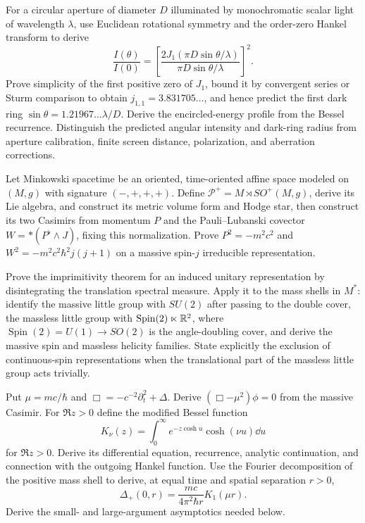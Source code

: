 \begin{exercise}
For a circular aperture of diameter $D$ illuminated by monochromatic scalar
light of wavelength $\lambda$, use Euclidean rotational symmetry and the
order-zero Hankel transform to derive
\[
 \frac{I(\theta)}{I(0)}=
 \left[\frac{2J_1(\pi D\sin\theta/\lambda)}
 {\pi D\sin\theta/\lambda}\right]^2.
\]
Prove simplicity of the first positive zero of $J_1$, bound it by convergent
series or Sturm comparison to obtain $j_{1,1}=3.831705\ldots$, and hence
predict the first dark ring
$\sin\theta=1.21967\ldots\lambda/D$.  Derive the encircled-energy profile
from the Bessel recurrence.  Distinguish the predicted angular intensity and
dark-ring radius from aperture calibration, finite screen distance,
polarization, and aberration corrections.
\end{exercise}

\begin{exercise}
Let Minkowski spacetime be an oriented, time-oriented affine space modeled on
$(M,g)$ with signature $(-,+,+,+)$.  Define
$\mathcal P^+=M\rtimes SO^+(M,g)$, derive its Lie algebra, and construct its
metric volume form and Hodge star, then construct its two Casimirs from
momentum $P$ and the Pauli--Lubanski covector
$W=* (P^\flat\wedge J)$, fixing this normalization.  Prove
$P^2=-m^2c^2$ and $W^2=-m^2c^2\hbar^2j(j+1)$ on a massive spin-$j$
irreducible representation.
\end{exercise}

\begin{exercise}
Prove the imprimitivity theorem for an induced unitary representation by
disintegrating the translation spectral measure.  Apply it to the mass shells
in $M^*$: identify the massive little group with $SU(2)$ after
passing to the double cover, the massless little group with
$\operatorname{Spin}(2)\ltimes\mathbb R^2$, where
$\operatorname{Spin}(2)=U(1)\to SO(2)$ is the angle-doubling cover, and
derive the massive spin and massless
helicity families.  State explicitly the exclusion of continuous-spin
representations when the translational part of the massless little group acts
trivially.
\end{exercise}

\begin{exercise}
Put $\mu=mc/\hbar$ and
$\Box=-c^{-2}\partial_t^2+\Delta$.  Derive
$(\Box-\mu^2)\phi=0$ from the massive Casimir.  For $\Re z>0$ define the
modified Bessel function
\[
 K_\nu(z)=\int_0^\infty e^{-z\cosh u}\cosh(\nu u)\dd u
\]
for $\Re z>0$.  Derive its differential equation, recurrence, analytic
continuation, and connection with the outgoing Hankel function.  Use
the Fourier decomposition of the positive mass shell to derive, at equal
time and spatial separation $r>0$,
\[
 \Delta_+(0,r)=\frac{mc}{4\pi^2\hbar r}K_1(\mu r).
\]
Derive the small- and large-argument asymptotics needed below.
\end{exercise}

